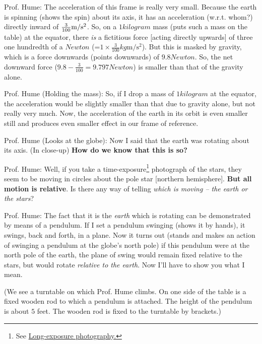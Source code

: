 \documentclass[a6paper]{article}
\begin{document}
Prof. Hume: The acceleration of this frame is really very small. Because the earth is spinning (shows the spin) about its axis, it has an acceleration (w.r.t. whom?) directly inward of $\frac{3}{100}\si[per-mode=symbol]{\metre\per\second^{2}}$. So, on a $1\si{kilogram}$ mass (puts such a mass on the table) at the equator, there \emph{is} a fictitious force [acting directly upwards] of three one hundredth of a $\si{Newton}$ (=$1\times\frac{3}{100}\si{kg\m\per\s^{2}}$). But this is masked by gravity, which is a force downwards (points downwards) of $9.8\si{Newton}$. So, the net downward force ($9.8-\frac{3}{100} = 9.797\si{Newton}$) is smaller than that of the gravity alone.

Prof. Hume (Holding the mass): So, if I drop a mass of $1\si{kilogram}$ at the equator, the acceleration would be slightly smaller than that due to gravity alone, but not really very much. Now, the acceleration of the earth in its orbit is even smaller still and produces even smaller effect in our frame of reference.

Prof. Hume (Looks at the globe): Now I said that the earth was rotating about its axis. (In close-up) \textbf{How do we know that this is so?}

Prof. Hume: Well, if you take a time-exposure\footnote{See \href{https://en.wikipedia.org/wiki/Long-exposure_photography}{Long-exposure photography.}} photograph of the stars, they seem to be moving in circles about the pole star [northern hemisphere]. \textbf{But all motion is relative}. Is there any way of telling \emph{which is moving -- the earth or the stars}?

Prof. Hume: The fact that it is the \emph{earth} which is rotating can be demonstrated by means of a pendulum. If I set a pendulum swinging (shows it by hands), it swings, back and forth, in a plane. Now it turns out (stands and makes an action of swinging a pendulum at the globe's north pole) if this pendulum were at the north pole of the earth, the plane of swing would remain fixed relative to the stars, but would rotate \emph{relative to the earth}. Now I'll have to show you what I mean. 

(We see a turntable on which Prof. Hume climbs. On one side of the table is a fixed wooden rod to which a pendulum is attached. The height of the pendulum is about $5$ feet. The wooden rod is fixed to the turntable by brackets.)
\end{document}
